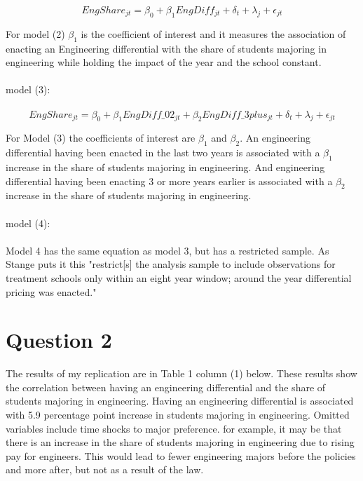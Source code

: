\documentclass[11pt]{article}
\begin{document}
$$
EngShare_{jt} = \beta_0 +  \beta_1  EngDiff_{jt} + \delta_t + \lambda_j + \epsilon_{jt}   $$

For model (2) $\beta_1$ is the coefficient of interest and it measures the association of enacting an Engineering differential with the share of students majoring in engineering while holding the impact of the year and the school constant. 
\\ \\ 
model (3): \\ \\ 
$$
EngShare_{jt} = \beta_0 +  \beta_1  EngDiff\_02_{jt} + \beta_2 EngDiff\_3plus_{jt} + \delta_t + \lambda_j + \epsilon_{jt}   $$

For Model (3) the coefficients of interest are $\beta_1$ and $\beta_2$. An engineering differential having been enacted in the last two years is associated with a $\beta_1$ increase in the share of students majoring in engineering. And engineering differential having been enacting 3 or more years earlier is associated with a $\beta_2$ increase in the share of students majoring in engineering. 
\\ \\
model (4): \\ \\ 

Model 4 has the same equation as model 3, but has a restricted sample. As Stange puts it this "restrict[s] the
analysis sample to include observations for treatment schools only within an eight year window; around the year differential pricing was enacted."




\section{Question 2}
The results of my replication are in Table 1 column (1) below. These results show the correlation between having an engineering differential and the share of students majoring in engineering. Having an engineering differential is associated with 5.9 percentage point increase in students majoring in engineering. Omitted variables include time shocks to major preference. for example, it may be that there is an increase in the share of students majoring in engineering due to rising pay for engineers. This would lead to fewer engineering majors before the policies and more after, but not as a result of the law.  
\end{document}
